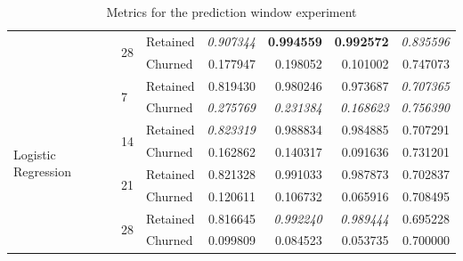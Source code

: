 \documentclass{kththesis}
\begin{document}
\begin{table}
\begin{tabular}{lllrrrr}
\cline{2-7}
     & \multirow{2}{*}{28} & Retained &  \textit{0.907344} &  \textbf{0.994559} &   \textbf{0.992572} &  \textit{0.835596} \\
     &   & Churned &  0.177947 &  0.198052 &   0.101002 &  0.747073 \\
\cline{1-7}
\cline{2-7}
\multirow{8}{*}{Logistic Regression} & \multirow{2}{*}{7} & Retained &  0.819430 &  0.980246 &   0.973687 &  \textit{0.707365} \\
     &   & Churned &  \textit{0.275769} &  \textit{0.231384} &   \textit{0.168623} &  \textit{0.756390} \\
\cline{2-7}
     & \multirow{2}{*}{14} & Retained &  \textit{0.823319} &  0.988834 &   0.984885 &  0.707291 \\
     &   & Churned &  0.162862 &  0.140317 &   0.091636 &  0.731201 \\
\cline{2-7}
     & \multirow{2}{*}{21} & Retained &  0.821328 &  0.991033 &   0.987873 &  0.702837 \\
     &   & Churned &  0.120611 &  0.106732 &   0.065916 &  0.708495 \\
\cline{2-7}
     & \multirow{2}{*}{28} & Retained &  0.816645 &  \textit{0.992240} &  \textit{0.989444} &  0.695228 \\
     &   & Churned &  0.099809 &  0.084523 &   0.053735 &  0.700000 \\
\bottomrule
\end{tabular}
\caption{Metrics for the prediction window experiment}
\label{tab:pred_window}
\end{table}

\end{document}
